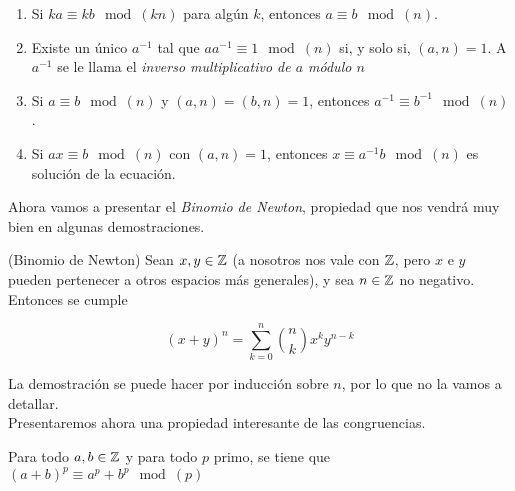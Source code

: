 \begin{proposicion}
\begin{enumerate}
		\item Si $ka \equiv kb \mod(kn)$ para algún $k$, entonces $a \equiv b \mod(n)$.
		
		\item Existe un único $a^{-1}$ tal que $aa^{-1} \equiv 1 \mod(n)$ si, y solo si, $(a, n) = 1$. A $a^{-1}$ se le llama el \textit{inverso multiplicativo de $a$ módulo $n$}
		
		\item Si $a \equiv b \mod(n)$ y $(a, n) = (b, n) = 1$, entonces $a^{-1} \equiv b^{-1} \mod(n)$.
		
		\item Si $ax \equiv b \mod(n)$ con $(a, n) = 1$, entonces $x \equiv a^{-1}b \mod(n)$ es solución de la ecuación.
	\end{enumerate}
\end{proposicion}

Ahora vamos a presentar el \textit{Binomio de Newton}, propiedad que nos vendrá muy bien en algunas demostraciones.

\begin{teorema}{(Binomio de Newton)}\label{binomio_de_newton}
	Sean $x, y \in \mathbb{Z}$ (a nosotros nos vale con $\mathbb{Z}$, pero $x$ e $y$ pueden pertenecer a otros espacios más generales), y sea $n \in \mathbb{Z}$ no negativo. Entonces se cumple
	
	\[ (x + y)^n = \sum_{k=0}^{n}\binom{n}{k}x^ky^{n-k} \]
\end{teorema}

La demostración se puede hacer por inducción sobre $n$, por lo que no la vamos a detallar.\\

Presentaremos ahora una propiedad interesante de las congruencias.

\begin{lema}\label{lema_abp_apbp}
	Para todo $a, b \in \mathbb{Z}$ y para todo $p$ primo, se tiene que $(a + b)^p \equiv a^p + b^p \mod(p)$
\end{lema}

